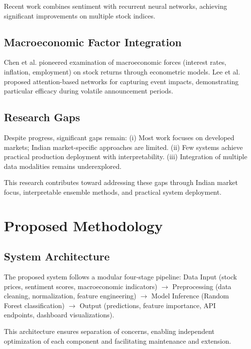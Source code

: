 \documentclass[conference]{IEEEtran}
\begin{document}
Recent work \cite{guo2022enhancing} combines sentiment with recurrent neural networks, achieving significant improvements on multiple stock indices.

\subsection{Macroeconomic Factor Integration}

Chen et al. \cite{chen1986economic} pioneered examination of macroeconomic forces (interest rates, inflation, employment) on stock returns through econometric models. Lee et al. \cite{lee2019event} proposed attention-based networks for capturing event impacts, demonstrating particular efficacy during volatile announcement periods.

\subsection{Research Gaps}

Despite progress, significant gaps remain: (i) Most work focuses on developed markets; Indian market-specific approaches are limited. (ii) Few systems achieve practical production deployment with interpretability. (iii) Integration of multiple data modalities remains underexplored.

This research contributes toward addressing these gaps through Indian market focus, interpretable ensemble methods, and practical system deployment.

\section{Proposed Methodology}
\label{sec:methodology}

\subsection{System Architecture}

The proposed system follows a modular four-stage pipeline: Data Input (stock prices, sentiment scores, macroeconomic indicators) $\rightarrow$ Preprocessing (data cleaning, normalization, feature engineering) $\rightarrow$ Model Inference (Random Forest classification) $\rightarrow$ Output (predictions, feature importance, API endpoints, dashboard visualizations).

This architecture ensures separation of concerns, enabling independent optimization of each component and facilitating maintenance and extension.
\end{document}
